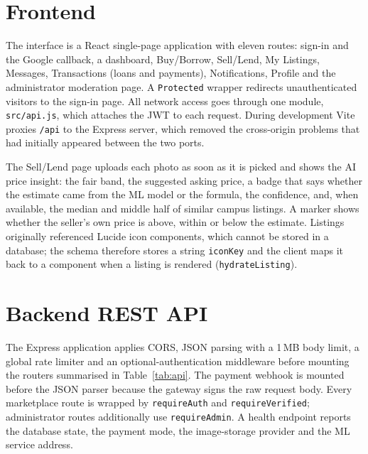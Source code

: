 \documentclass[11pt,letterpaper,oneside]{report}
\newcommand{\code}[1]{\texttt{#1}}
\begin{document}
\section{Frontend}
The interface is a React single-page application with eleven routes: sign-in and the Google callback, a
dashboard, Buy/Borrow, Sell/Lend, My Listings, Messages, Transactions (loans and payments), Notifications,
Profile and the administrator moderation page. A \code{Protected} wrapper redirects unauthenticated visitors
to the sign-in page. All network access goes through one module, \code{src/api.js}, which attaches the JWT
to each request. During development Vite proxies \code{/api} to the Express server, which removed the
cross-origin problems that had initially appeared between the two ports.

The Sell/Lend page uploads each photo as soon as it is picked and shows the AI price insight: the fair
band, the suggested asking price, a badge that says whether the estimate came from the ML model or the
formula, the confidence, and, when available, the median and middle half of similar campus listings.
A marker shows whether the seller's own price is above, within or below the estimate. Listings originally
referenced Lucide icon components, which cannot be stored in a database; the schema therefore stores a
string \code{iconKey} and the client maps it back to a component when a listing is rendered
(\code{hydrateListing}).

\section{Backend REST API}
The Express application applies CORS, JSON parsing with a 1\,MB body limit, a global rate limiter
and an optional-authentication middleware before mounting the routers summarised in Table~\ref{tab:api}.
The payment webhook is mounted before the JSON parser because the gateway signs the raw request body.
Every marketplace route is wrapped by \code{requireAuth} and \code{requireVerified}; administrator routes
additionally use \code{requireAdmin}. A health endpoint reports the database state, the payment mode,
the image-storage provider and the ML service address.
\end{document}
